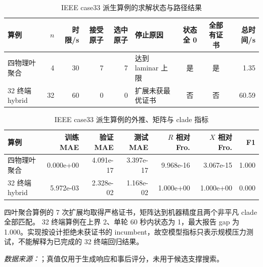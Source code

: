 \begin{table}[htbp]
\centering
\caption{IEEE case33 派生算例的求解状态与路径结果}
\label{tab:case33-status}
\scriptsize
\begin{tabularx}{\textwidth}{lrrrr>{\raggedright\arraybackslash}Xccr}
\toprule
算例 & $n$ & 时限/s & 接受原子 & 选中原子 & 停止原因 & 状态全 0 & 全部有证书 & 总时间/s \\
\midrule
四物理叶聚合 & 4 & 30 & 7 & 7 & 达到 laminar 上限 & 是 & 是 & 1.35 \\
32 终端 hybrid & 32 & 60 & 0 & 0 & 扩展未获最优证书 & 否 & 否 & 60.59 \\
\bottomrule
\end{tabularx}
\end{table}

\begin{table}[htbp]
\centering
\caption{IEEE case33 派生算例的外推、矩阵与 clade 指标}
\label{tab:case33-quality}
\scriptsize
\begin{tabular}{lrrrrrr}
\toprule
算例 & 训练 MAE & 验证 MAE & 测试 MAE & $R$ 相对 Fro. & $X$ 相对 Fro. & F1 \\
\midrule
四物理叶聚合 & 0.000e+00 & 4.091e-17 & 3.397e-17 & 9.968e-16 & 3.067e-15 & 1.000 \\
32 终端 hybrid & 5.972e-03 & 2.328e-02 & 1.168e-02 & 1.000e+00 & 1.000e+00 & 0.000 \\
\bottomrule
\end{tabular}
\end{table}

\FloatBarrier
\noindent 四叶聚合算例的 7 次扩展均取得严格证书，矩阵达到机器精度且两个非平凡 clade 全部匹配。
32 终端算例在上界 2、单轮 60 秒内状态为 1，最大报告 gap 为 1.000。实现按设计拒绝未获证书的 incumbent，故空模型指标只表示规模压力测试，不能解释为已完成的 32 终端回归结果。
\par\smallskip\textit{数据来源：}；真值仅用于生成响应和事后评分，未用于候选支撑搜索。
